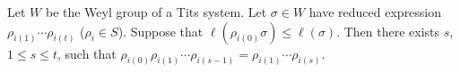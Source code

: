 Let $W$ be the Weyl group of a Tits system. Let $\sigma \in W$ have reduced expression $\rho_{i(1)} \cdots \rho_{i(t)}$ ($\rho_i \in S$). Suppose that $\ell(\rho_{i(0)}\sigma) \leqslant \ell(\sigma)$. Then there exists $s$, $1 \leqslant s \leqslant t$, such that $\rho_{i(0)}\rho_{i(1)} \cdots \rho_{i(s-1)} = \rho_{i(1)} \cdots \rho_{i(s)}$.
